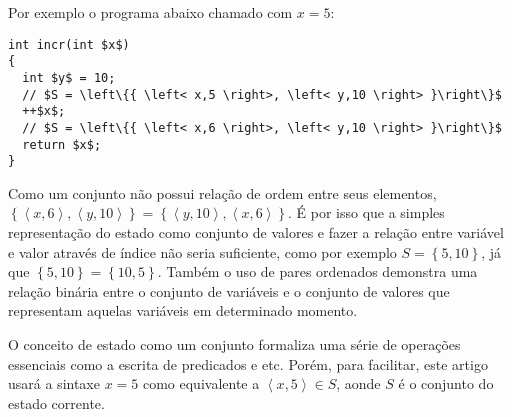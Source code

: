 \documentclass[12pt]{article}
\begin{document}
Por exemplo o programa abaixo chamado com $x=5$:

\begin{lstlisting}[mathescape=true]
int incr(int $x$)
{
  int $y$ = 10;
  // $S = \left\{{ \left< x,5 \right>, \left< y,10 \right> }\right\}$
  ++$x$;
  // $S = \left\{{ \left< x,6 \right>, \left< y,10 \right> }\right\}$
  return $x$;
}
\end{lstlisting}

Como um conjunto não possui relação de ordem entre seus elementos,
$\left\{{ \left< x,6 \right>, \left< y,10 \right> }\right\} = \left\{{
    \left< y,10 \right>, \left< x,6 \right> }\right\}$. É por isso que
a simples representação do estado como conjunto de valores e fazer a
relação entre variável e valor através de índice não seria suficiente,
como por exemplo $S = \left\{{5,10}\right\}$, já que
$\left\{{5,10}\right\} = \left\{{10,5}\right\}$. Também o uso de pares
ordenados demonstra uma relação binária entre o conjunto de variáveis
e o conjunto de valores que representam aquelas variáveis em
determinado momento.

O conceito de estado como um conjunto formaliza uma série de operações
essenciais como a escrita de predicados e etc. Porém, para facilitar,
este artigo usará a sintaxe $x = 5$ como equivalente a
$\left<x,5\right> \in S$, aonde $S$ é o conjunto do estado corrente.
\end{document}
